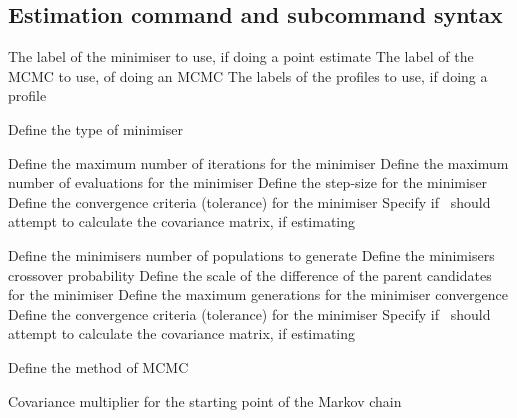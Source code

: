 \subsection{Estimation command and subcommand syntax}\par
{}\par\par
{} {The label of the minimiser to use, if doing a point estimate}
 {The label of the MCMC to use, of doing an MCMC}
 {The labels of the profiles to use, if doing a profile}
\par{}\par\par
{} {Define the type of minimiser}
\par\textbf{}\par
{} {Define the maximum number of iterations for the minimiser}
 {Define the maximum number of evaluations for the minimiser}
 {Define the step-size for the minimiser}
 {Define the convergence criteria (tolerance) for the minimiser}
 {Specify if \SPM\ should attempt to calculate the covariance matrix, if estimating}
\par\textbf{}\par
{} {Define the minimisers number of populations to generate}
 {Define the minimisers crossover probability }
 {Define the scale of the difference of the parent candidates for the minimiser}
 {Define the maximum generations for the minimiser convergence}
 {Define the convergence criteria (tolerance) for the minimiser}
 {Specify if \SPM\ should attempt to calculate the covariance matrix, if estimating}
\par{}\par\par
{} {Define the method of MCMC}
\par\textbf{}\par
{} {Covariance multiplier for the starting point of the Markov chain}
